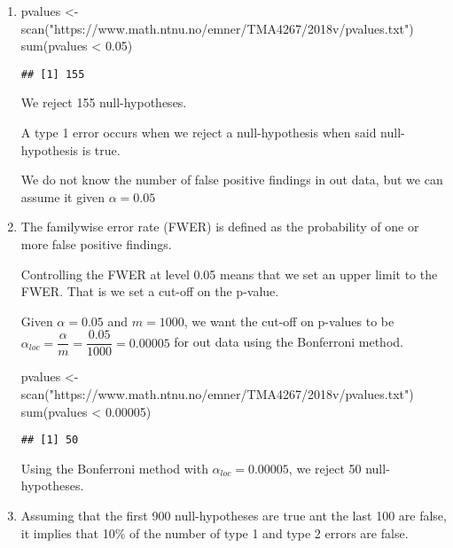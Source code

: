 \documentclass[
]{article}
\newenvironment{Shaded}{\begin{snugshade}}{\end{snugshade}}
\newcommand{\FloatTok}[1]{\textcolor[rgb]{0.00,0.00,0.81}{#1}}
\newcommand{\FunctionTok}[1]{\textcolor[rgb]{0.00,0.00,0.00}{#1}}
\newcommand{\NormalTok}[1]{#1}
\newcommand{\OtherTok}[1]{\textcolor[rgb]{0.56,0.35,0.01}{#1}}
\newcommand{\SpecialCharTok}[1]{\textcolor[rgb]{0.00,0.00,0.00}{#1}}
\newcommand{\StringTok}[1]{\textcolor[rgb]{0.31,0.60,0.02}{#1}}
\begin{document}
\begin{enumerate}
\def\labelenumi{\alph{enumi}.}
\item
\begin{Shaded}
\begin{Highlighting}[]
\NormalTok{pvalues }\OtherTok{\textless{}{-}} \FunctionTok{scan}\NormalTok{(}\StringTok{"https://www.math.ntnu.no/emner/TMA4267/2018v/pvalues.txt"}\NormalTok{)}
\FunctionTok{sum}\NormalTok{(pvalues }\SpecialCharTok{\textless{}} \FloatTok{0.05}\NormalTok{)}
\end{Highlighting}
\end{Shaded}

\begin{verbatim}
## [1] 155
\end{verbatim}

  We reject 155 null-hypotheses.

  A type 1 error occurs when we reject a null-hypothesis when said
  null-hypothesis is true.

  We do not know the number of false positive findings in out data, but
  we can assume it given \(\alpha = 0.05\)
\item
  The familywise error rate (FWER) is defined as the probability of one
  or more false positive findings.

  Controlling the FWER at level 0.05 means that we set an upper limit to
  the FWER. That is we set a cut-off on the p-value.

  Given \(\alpha = 0.05\) and \(m = 1000\), we want the cut-off on
  p-values to be
  \(\alpha_{loc} = \dfrac{\alpha}{m} = \dfrac{0.05}{1000} = 0.00005\)
  for out data using the Bonferroni method.

\begin{Shaded}
\begin{Highlighting}[]
\NormalTok{pvalues }\OtherTok{\textless{}{-}} \FunctionTok{scan}\NormalTok{(}\StringTok{"https://www.math.ntnu.no/emner/TMA4267/2018v/pvalues.txt"}\NormalTok{)}
\FunctionTok{sum}\NormalTok{(pvalues }\SpecialCharTok{\textless{}} \FloatTok{0.00005}\NormalTok{)}
\end{Highlighting}
\end{Shaded}

\begin{verbatim}
## [1] 50
\end{verbatim}

  Using the Bonferroni method with \(\alpha_{loc} = 0.00005\), we reject
  50 null-hypotheses.
\item
  Assuming that the first 900 null-hypotheses are true ant the last 100
  are false, it implies that 10\% of the number of type 1 and type 2
  errors are false.
\end{enumerate}
\end{document}
